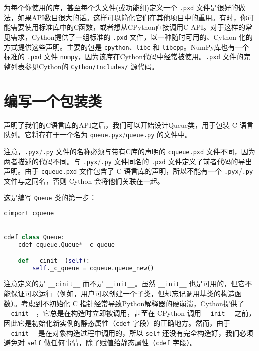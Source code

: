 \begin{translation}
为每个你使用的库，甚至每个头文件(或功能组)定义一个 \lstinline{.pxd} 文件是很好的做法，如果API数目很大的话。这样可以简化它们在其他项目中的重用。有时，你可能需要使用标准库中的C函数，或者想从CPython直接调用C-API。对于这样的常见需求，Cython提供了一组标准的 \lstinline{.pxd} 文件，以一种随时可用的、Cython 化的方式提供这些声明。主要的包是 \lstinline{cpython}、\lstinline{libc} 和 \lstinline{libcpp}。NumPy库也有一个标准的 \lstinline{.pxd} 文件 \lstinline{numpy}，因为该库在Cython代码中经常被使用。\lstinline{.pxd} 文件的完整列表参见Cython的 \lstinline{Cython/Includes/} 源代码。

\section{编写一个包装类}

声明了我们的C语言库的API之后，我们可以开始设计Queue类，用于包装 C 语言队列。它将存在于一个名为 \lstinline{queue.pyx}/\lstinline{queue.py} 的文件中。

注意，\lstinline{.pyx}/\lstinline{.py} 文件的名称必须与带有C库的声明的 \lstinline{cqueue.pxd} 文件不同，因为两者描述的代码不同。与 \lstinline{.pyx}/\lstinline{.py} 文件同名的 \lstinline{.pxd} 文件定义了前者代码的导出声明。由于 \lstinline{cqueue.pxd} 文件包含了 C 语言库的声明，所以不能有一个 \lstinline{.pyx}/\lstinline{.py} 文件与之同名，否则 Cython 会将他们关联在一起。

这是编写 \lstinline{Queue} 类的第一步：

\begin{framed}
\begin{lstlisting}[language=python]
cimport cqueue


cdef class Queue:
    cdef cqueue.Queue* _c_queue

    def __cinit__(self):
        self._c_queue = cqueue.queue_new()
\end{lstlisting}
\end{framed}

注意定义的是 \lstinline{__cinit__} 而不是 \lstinline{__init__}。虽然 \lstinline{__init__} 也是可用的，但它不能保证可以运行（例如，用户可以创建一个子类，但却忘记调用基类的构造函数）。考虑到不初始化 C 指针经常导致Python解释器的硬崩溃，Cython提供了 \lstinline{__cinit__}，它总是在构造时立即被调用，甚至在 CPython 调用 \lstinline{__init__} 之前，因此它是初始化新实例的静态属性（\lstinline{cdef} 字段）的正确地方。然而，由于 \lstinline{__cinit__} 是在对象构造过程中调用的，所以 \lstinline{self} 还没有完全构造好，我们必须避免对 \lstinline{self} 做任何事情，除了赋值给静态属性（\lstinline{cdef} 字段）。


\end{translation}
